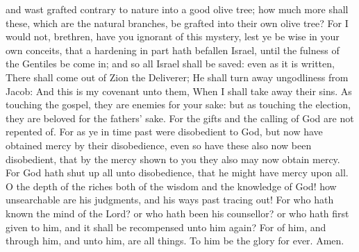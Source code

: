 and wast grafted contrary to nature into a good olive tree; how much more shall these, which are the natural branches, be grafted into their own olive tree?  For I would not, brethren, have you ignorant of this mystery, lest ye be wise in your own conceits, that a hardening in part hath befallen Israel, until the fulness of the Gentiles be come in; and so all Israel shall be saved: even as it is written, There shall come out of Zion the Deliverer; He shall turn away ungodliness from Jacob:  And this is my covenant unto them, When I shall take away their sins.  As touching the gospel, they are enemies for your sake: but as touching the election, they are beloved for the fathers’ sake. For the gifts and the calling of God are not repented of. For as ye in time past were disobedient to God, but now have obtained mercy by their disobedience, even so have these also now been disobedient, that by the mercy shown to you they also may now obtain mercy. For God hath shut up all unto disobedience, that he might have mercy upon all.  O the depth of the riches both of the wisdom and the knowledge of God! how unsearchable are his judgments, and his ways past tracing out! For who hath known the mind of the Lord? or who hath been his counsellor? or who hath first given to him, and it shall be recompensed unto him again? For of him, and through him, and unto him, are all things. To him be the glory for ever. Amen. 

